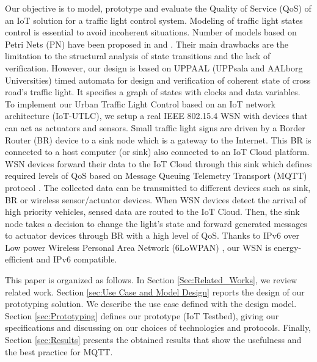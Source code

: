 Our objective is to model,
	prototype and evaluate the Quality of Service (QoS) of an IoT solution for a traffic light control system.
Modeling  of traffic light states control is essential to avoid incoherent situations.
Number of models based on Petri Nets (PN) have been proposed in \cite{difebbraro_trafficresponsive_2006} and \cite{huang_modular_2014}.
Their main drawbacks are the limitation to the structural analysis of state transitions and the lack of verification.
However,
	our design is based on UPPAAL (UPPsala and AALborg Universities) \cite{david_uppaal_2015} timed automata for design and verification of coherent state of cross road's traffic light.
It specifies a graph of states with clocks and data variables.
To implement our Urban Traffic Light Control based on an IoT network architecture (IoT-UTLC),
	we setup a real IEEE 802.15.4 WSN with devices that can act as actuators and sensors.
Small traffic light signs are driven by a Border Router (BR) device  to a sink node which is a gateway to the Internet.
This BR is connected to a host computer (or sink) also connected to an IoT Cloud platform.
WSN devices forward their data to the IoT Cloud through this sink which defines required levels of QoS based on Message Queuing Telemetry Transport (MQTT) protocol \cite{Al-Fuqaha2015}.
The collected data can be transmitted to different devices such as sink,
	BR or wireless sensor/actuator devices.
When WSN devices detect the arrival of high priority vehicles,
	sensed data are routed to the IoT Cloud.
Then,
	the sink node takes a decision to change the light's state and forward generated messages to actuator devices through BR with a high level of QoS.
Thanks to IPv6 over Low power Wireless Personal Area Network (6LoWPAN) \cite{chalappuram_development_2016},
	our WSN is energy-efficient and IPv6 compatible.


This paper is organized as follows.
In Section \ref{Sec:Related_Works},
	we review related work.
Section \ref{sec:Use Case and Model Design} reports the design of our prototyping solution.
We describe the use case defined with the design model.
Section \ref{sec:Prototyping} defines our prototype (IoT Testbed),
	giving our specifications and discussing on our choices of technologies and protocols.
Finally,
	Section \ref{sec:Results} presents the obtained results that show the usefulness and the best practice for MQTT.

